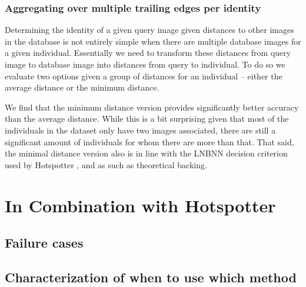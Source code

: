 
\subsubsection{Aggregating over multiple trailing edges per identity}

Determining the identity of a given query image given distances to other images in the database is not entirely simple when there are multiple database images for a given individual.
Essentially we need to transform these distances from query image to database image into distances from query to individual.
To do so we evaluate two options given a group of distances for an individual -- either the average distance or the minimum distance.

We find that the minimum distance version provides significantly better accuracy than the average distance. %
While this is a bit surprising given that most of the individuals in the dataset only have two images associated, there are still a significant amount of individuals for whom there are more than that.
That said, the minimal distance version also is in line with the LNBNN decision criterion used by Hotspotter \cite{crall_hotspotter_2013}, and as such as theoretical backing. %

\section{In Combination with Hotspotter}

\subsection{Failure cases}

\subsection{Characterization of when to use which method}


